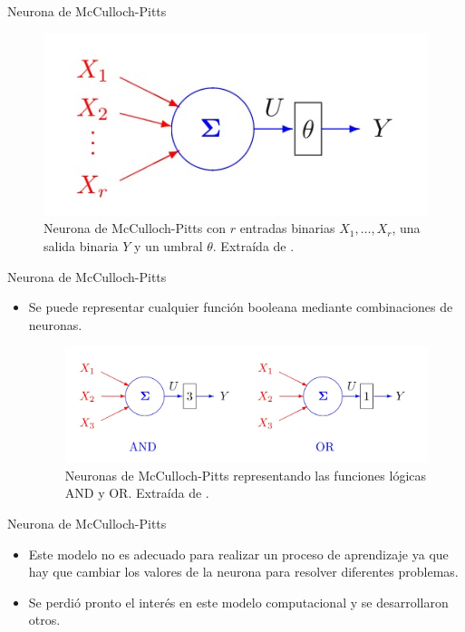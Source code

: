 \documentclass[spanish]{beamer}
\begin{document}
\begin{frame}{Neurona de McCulloch-Pitts}
  \begin{figure}[h]
    \centering
    \includegraphics[width=.7\textwidth]{img/mcculloch-pitts}
    \caption{Neurona de McCulloch-Pitts con $r$ entradas binarias $X_1,\dots,X_r$, una salida binaria $Y$ y un umbral $\theta$. Extraída de \parencite{izenman_modern_2008}.}
    \label{fig:mcculloch-pitts}
  \end{figure}
\end{frame}

\begin{frame}{Neurona de McCulloch-Pitts}
  \begin{itemize}
    \item Se puede representar cualquier función booleana mediante combinaciones de neuronas.

    \vspace{1em}

    \begin{figure}[h]
    \centering
    \includegraphics[width=.8\textwidth]{img/and-or}
    \caption{Neuronas de McCulloch-Pitts representando las funciones lógicas AND y OR. Extraída de \parencite{izenman_modern_2008}.}
    \label{fig:and-or}
  \end{figure}
  \end{itemize}
\end{frame}

\begin{frame}{Neurona de McCulloch-Pitts}
  \begin{itemize}
    \item Este modelo no es adecuado para realizar un proceso de aprendizaje ya que hay que cambiar los valores de la neurona para resolver diferentes problemas.
    \item Se perdió pronto el interés en este modelo computacional y se desarrollaron otros.
  \end{itemize}
\end{frame}
\end{document}
